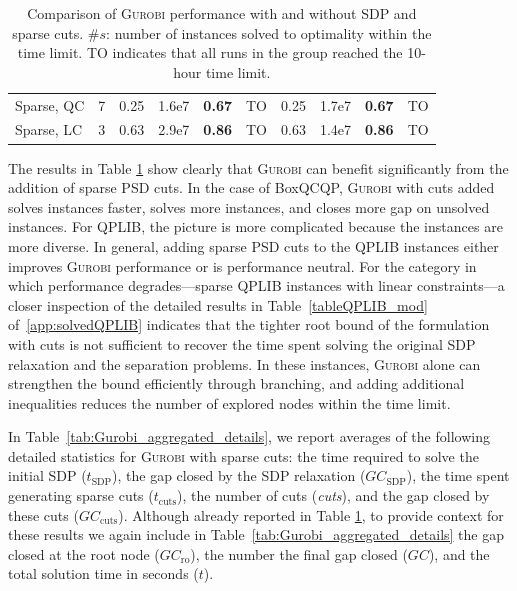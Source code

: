 \documentclass[twoside]{article}
\begin{document}
\begin{table}[h!]
{\begin{tabular}{lr|rrrr|rrrr}
				Sparse, QC      & 7 & 0.25 & 1.6e7 & \textbf{0.67} & TO & 0.25 & 1.7e7 & \textbf{0.67} & TO \\
				Sparse, LC      & 3 & 0.63 & 2.9e7 & \textbf{0.86} & TO & 0.63 & 1.4e7 & \textbf{0.86} & TO \\
				\bottomrule
		\end{tabular}}
		\caption{Comparison of \textsc{Gurobi} performance with and without SDP and sparse cuts. $\#s$: number of instances solved to optimality within the time limit. TO indicates that all runs in the group reached the 10-hour time limit.}
		\label{tab:Gurobi_aggregated}
	\end{table}
	
	The results in Table \ref{tab:Gurobi_aggregated} show clearly that \textsc{Gurobi} can benefit significantly from the addition of sparse PSD cuts.  In the case of BoxQCQP, \textsc{Gurobi} with cuts added solves instances faster, solves more instances, and closes more gap on unsolved instances.  For QPLIB, the picture is more complicated because the instances are more diverse. In general, adding sparse PSD cuts to the QPLIB instances either improves \textsc{Gurobi} performance or is performance neutral.  For the category in which performance degrades---sparse QPLIB instances with linear constraints---a closer inspection of the detailed results in Table~\ref{tableQPLIB_mod} of~\ref{app:solvedQPLIB} indicates that the tighter root bound of the formulation with cuts is not sufficient to recover the time spent solving the original SDP relaxation and the separation problems. In these instances, \textsc{Gurobi} alone can strengthen the bound efficiently through branching, and adding additional inequalities reduces the number of explored nodes within the time limit. 
	
	In Table~\ref{tab:Gurobi_aggregated_details}, we  report averages of the following detailed statistics for \textsc{Gurobi} with sparse cuts: the time required to solve the initial SDP ($t_{\text{SDP}}$), the gap closed by the SDP relaxation ($GC_{\text{SDP}}$), the time spent generating sparse cuts ($t_{\text{cuts}}$), the number of cuts (\textit{cuts}), and the gap closed by these cuts ($GC_{\text{cuts}}$). Although already reported in Table \ref{tab:Gurobi_aggregated}, to provide context for these results we again include in Table~\ref{tab:Gurobi_aggregated_details} the gap closed at the root node ($GC_{\text{ro}}$), the number the final gap closed ($GC$), and the total solution time in seconds ($t$).
	
	
	
\end{document}
